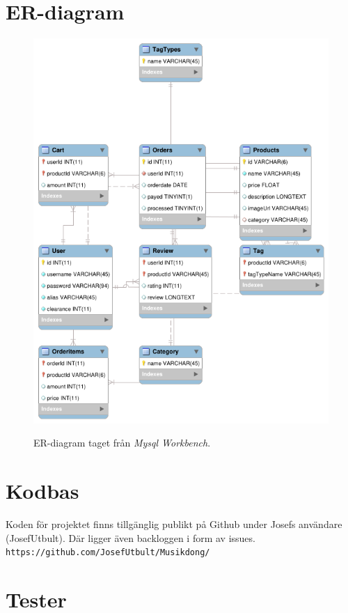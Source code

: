 \documentclass[a4paper]{article}
\begin{document}
\section{ER-diagram}
\begin{figure}[H]
\includegraphics[width=\textwidth,height=\textheight,keepaspectratio]{ER.png}
\caption \newline ER-diagram taget från \textit{Mysql Workbench}.
\centering
\end{figure}
%
\section{Kodbas}
Koden för projektet finns tillgänglig publikt på Github under Josefs användare (JosefUtbult). Där ligger även backloggen i form av issues. \\
\texttt{https://github.com/JosefUtbult/Musikdong/}
%
\section{Tester}
\end{document}

